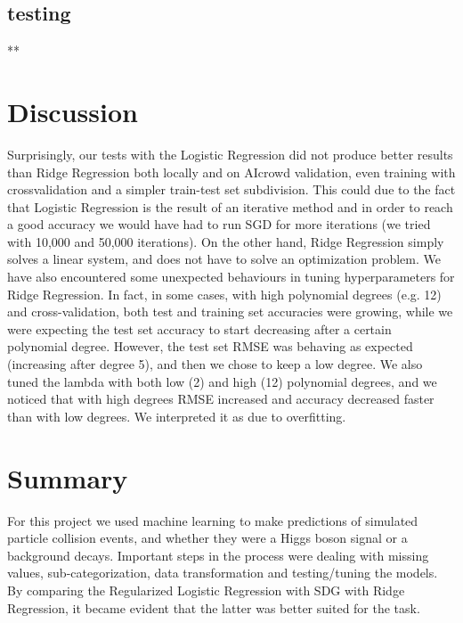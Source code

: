 \documentclass[10pt,conference,compsocconf]{IEEEtran}
\begin{document}
    \subsection{testing}
    **\\
    
    
\section{Discussion}
    Surprisingly, our tests with the Logistic Regression did not produce better results than Ridge Regression both locally and on AIcrowd validation, even training with crossvalidation and a simpler train-test set subdivision. This could due to the fact that Logistic Regression is the result of an iterative method and in order to reach a good accuracy we would have had to run SGD for more iterations (we tried with 10,000 and 50,000 iterations).
    On the other hand, Ridge Regression simply solves a linear system, and does not have to solve an optimization problem. We have also encountered some unexpected behaviours in tuning hyperparameters for Ridge Regression. In fact, in some cases, with high polynomial degrees (e.g. 12) and cross-validation, both test and training set accuracies were growing, while we were expecting the test set accuracy to start decreasing after a certain polynomial degree. However, the test set RMSE was behaving as expected (increasing after degree 5), and then we chose to keep a low degree. We also tuned the lambda with both low (2) and high (12) polynomial degrees, and we noticed that with high degrees RMSE increased and accuracy decreased faster than with low degrees. We interpreted it as due to overfitting.\\

\section{Summary}
    For this project we used machine learning to make predictions of simulated particle collision events, and whether they were a Higgs boson signal or a background decays. Important steps in the process were dealing with missing values, sub-categorization, data transformation
    and testing/tuning the models. By comparing the Regularized Logistic Regression with SDG with Ridge Regression, it became evident that the latter was better suited for the task.
\end{document}
